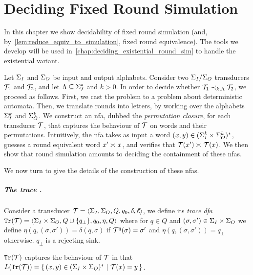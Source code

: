 \chapter{Deciding Fixed Round Simulation}
\label{chap:deciding_fixed_round_sim}

In this chapter we show decidability of fixed round simulation (and, by~\cref{lem:reduce_equiv_to_simulation}, fixed round equivalence). The tools we develop will be used in~\cref{chap:deciding_existential_round_sim} to handle the existential variant.

Let $\Sigma_{I}$ and $\Sigma_{O}$ be input and output alphabets. Consider two $\Sigma_{I}/\Sigma_{O}$ transducers $\mathcal{T}_1$ and $\mathcal{T}_2$, and let $\Lambda\subseteq \Sigma_{I}^*$ and $k>0$.
In order to decide whether $\mathcal{T}_1\prec_{k,\Lambda} \mathcal{T}_2$, we proceed as follows. First, we cast the problem to a problem about deterministic automata. Then, we translate rounds into letters, by working over the alphabets $\Sigma_{I}^k$ and $\Sigma_{O}^k$. We construct an \gls{nfa}, dubbed the \emph{permutation closure}, for each transducer $\mathcal{T}$, that captures the behaviour of $\mathcal{T}$ on words and their permutations. Intuitively, the \gls{nfa} takes as input a word $(x,y)\in (\Sigma_{I}^{k}\times \Sigma_{O}^k)^*$, guesses a round equivalent word $x'\asymp_{} x$, and verifies that $\mathcal{T}(x')\asymp_{} \mathcal{T}(x)$. We then show that round simulation amounts to deciding the containment of these \glspl{nfa}.

We now turn to give the details of the construction of these \glspl{nfa}.

\paragraph{The trace .} Consider a transducer $\mathcal{T}=\left< \Sigma_{I},\Sigma_{O},Q,q_0,\delta,\boldsymbol{\ell}\right>$, we define its \emph{trace \gls{dfa}} ${\mathtt{Tr}}(\mathcal{T})=\left< \Sigma_{I}\times\Sigma_{O},Q\cup\{q_{\bot}\},q_0,\eta,Q\right>$ where for $q\in Q$ and $(\sigma,\sigma')\in \Sigma_{I}\times \Sigma_{O}$ we define $\eta(q,(\sigma,\sigma'))=\delta(q,\sigma)$ if $\mathcal{T}^{q}(\sigma)=\sigma'$ and $\eta(q,(\sigma,\sigma'))=q_{\bot}$ otherwise.
$q_\bot$ is a rejecting sink. 

${\mathtt{Tr}}(\mathcal{T})$ captures the behaviour of $\mathcal{T}$ in that $L({\mathtt{Tr}}(\mathcal{T}))=\left\{\,(x,y)\in (\Sigma_{I}\times \Sigma_{O})^*\ \middle|\ \mathcal{T}(x)=y\,\right\}$. 


